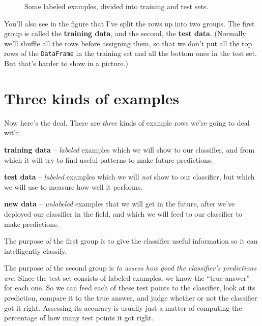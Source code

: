 \begin{figure}[ht]
\centering
{}
\smallskip
\caption{Some labeled examples, divided into training and test sets.}
\label{fig:labeledTrainTest}
\end{figure}


You'll also see in the figure that I've split the rows up into two groups. The
first group is called the \textbf{training data}, and the second, the
\textbf{test data}. (Normally we'll shuffle all the rows before assigning them,
so that we don't put all the top rows of the \texttt{DataFrame} in the training
set and all the bottom ones in the test set. But that's harder to show in a
picture.)

\section{Three kinds of examples}

Now here's the deal. There are \textit{three} kinds of example rows we're going
to deal with:

\begin{compactenum}
\item \textbf{training data} -- \textit{labeled} examples which we will show to
our classifier, and from which it will try to find useful patterns to make
future predictions.
\item \textbf{test data} -- \textit{labeled} examples which we will
\textit{not} show to
our classifier, but which we will use to measure how well it performs.
\item \textbf{new data} -- \textit{unlabeled} examples that we will get in the
future, after we've deployed our classifier in the field, and which we will
feed to our classifier to make predictions.
\end{compactenum}

The purpose of the first group is to give the classifier useful information so
it can intelligently classify.

The purpose of the second group is \textit{to assess how good the classifier's
predictions are.} Since the test set consists of labeled examples, we know the
``true answer'' for each one. So we can feed each of these test points to the
classifier, look at its prediction, compare it to the true answer, and judge
whether or not the classifier got it right. Assessing its accuracy is usually
just a matter of computing the percentage of how many test points it got right.

